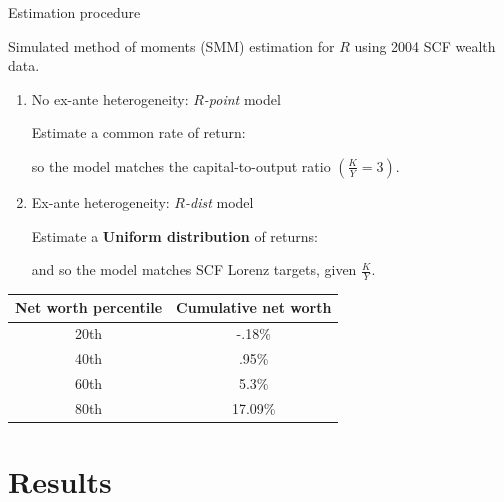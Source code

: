 \documentclass{beamer}
\begin{document}



\begin{frame}{Estimation procedure}


Simulated method of moments (SMM) estimation for $R$ using 2004 SCF wealth data.


  \begin{enumerate}
  \item No ex-ante heterogeneity: $R$\textit{-point} model
    \par Estimate a common rate of return:

    \par  {} so the model  matches the capital-to-output ratio $(\frac{K}{Y} = 3)$.
  \vspace{2.5mm}

  \item Ex-ante heterogeneity: $R$\textit{-dist} model
    \par Estimate  a \textbf{Uniform distribution} of returns:

    \par {} and  so the model matches SCF Lorenz targets, given $\frac{K}{Y}$.
  \end{enumerate}

   \vspace{2.5mm}
  \centering
  \small
  \begin{tabular}{|c|c|}
\hline
Net worth percentile & Cumulative net worth \\
\hline
20th & -.18\%  \\
40th &  .95\% \\
60th &  5.3\% \\
80th &  17.09\% \\
\hline
\end{tabular}


\end{frame}


\section{Results}
\end{document}
